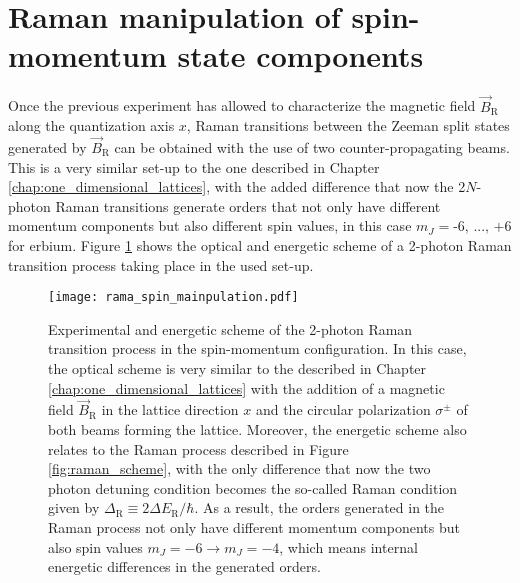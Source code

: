 \section{Raman manipulation of spin-momentum state components}

Once the previous experiment has allowed to characterize the magnetic field $\vec{B}_{\text{R}}$ along the quantization axis $x$, Raman transitions between the Zeeman split states generated by $\vec{B}_{\text{R}}$ can be obtained with the use of two counter-propagating beams. This is a very similar set-up to the one described in Chapter \ref{chap:one_dimensional_lattices}, with the added difference that now the 2$N$-photon Raman transitions generate orders that not only have different momentum components but also different spin values, in this case $m_J = \text{-6, ..., +6}$ for erbium. Figure \ref{fig:raman_manipulation} shows the optical and energetic scheme of a 2-photon Raman transition process taking place in the used set-up.

\begin{figure}[!htbp]\centering
	\texttt{[image: rama\_spin\_mainpulation.pdf]}
	\caption[Experimental and energetic scheme of the 2-photon Raman transition process in the spin-momentum configuration]{Experimental and energetic scheme of the 2-photon Raman transition process in the spin-momentum configuration. In this case, the optical scheme is very similar to the described in Chapter \ref{chap:one_dimensional_lattices} with the addition of a magnetic field $\vec{B}_\text{R}$ in the lattice direction $x$ and the circular polarization $\sigma^\pm$ of both beams forming the lattice. Moreover, the energetic scheme also relates to the Raman process described in Figure \ref{fig:raman_scheme}, with the only difference that now the two photon detuning condition becomes the so-called Raman condition given by $\Delta_\text{R} \equiv 2\Delta E_\text{R}/\hbar$. As a result, the orders generated in the Raman process not only have different momentum components but also spin values  $m_{J}=-6 \rightarrow m_{J}=-4$, which means internal energetic differences in the generated orders. }\label{fig:raman_manipulation}
\end{figure}

\pagebreak

